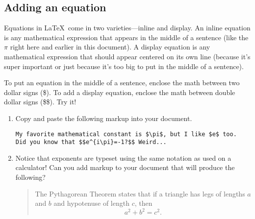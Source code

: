 \subsection*{Adding an equation}

Equations in \LaTeX\ come in two varieties---inline and display.
An inline equation is any mathematical expression that appears in
the middle of a sentence (like the $\pi$ right here and earlier in
this document). A display equation is any mathematical expression
that should appear centered on its own line (because it's super important
or just because it's too big to put in the middle of a sentence).

To put an equation in the middle of a sentence, enclose the math between
two dollar signs (\$). To add a display equation, enclose the math
between double dollar signs (\$\$). Try it!

\begin{enumerate}
\item Copy and paste the following markup into your document.
\bigskip

\begin{codeblock}
\begin{verbatim}
My favorite mathematical constant is $\pi$, but I like $e$ too.
Did you know that $$e^{i\pi}=-1?$$ Weird...
\end{verbatim}
\end{codeblock}
\bigskip

\item Notice that exponents are typeset using the same notation as used
on a calculator! Can you add markup to your document that will produce
the following?

\begin{quote}
The Pythagorean Theorem states that if a triangle has legs of lengths
$a$ and $b$ and hypotenuse of length $c$, then
\[
a^{2}+b^{2}=c^{2}.
\]
\end{quote}

\end{enumerate}
